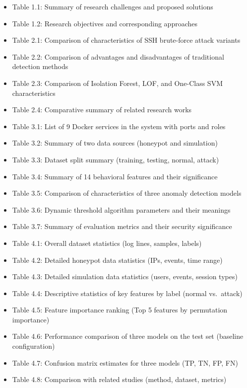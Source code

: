 \documentclass[
  a4paper]{report}
\providecommand{\tightlist}{%
  \setlength{\itemsep}{0pt}\setlength{\parskip}{0pt}}
\begin{document}
\begin{itemize}
\tightlist
\item
  Table 1.1: Summary of research challenges and proposed solutions
\item
  Table 1.2: Research objectives and corresponding approaches
\item
  Table 2.1: Comparison of characteristics of SSH brute-force attack
  variants
\item
  Table 2.2: Comparison of advantages and disadvantages of traditional
  detection methods
\item
  Table 2.3: Comparison of Isolation Forest, LOF, and One-Class SVM
  characteristics
\item
  Table 2.4: Comparative summary of related research works
\item
  Table 3.1: List of 9 Docker services in the system with ports and
  roles
\item
  Table 3.2: Summary of two data sources (honeypot and simulation)
\item
  Table 3.3: Dataset split summary (training, testing, normal, attack)
\item
  Table 3.4: Summary of 14 behavioral features and their significance
\item
  Table 3.5: Comparison of characteristics of three anomaly detection
  models
\item
  Table 3.6: Dynamic threshold algorithm parameters and their meanings
\item
  Table 3.7: Summary of evaluation metrics and their security
  significance
\item
  Table 4.1: Overall dataset statistics (log lines, samples, labels)
\item
  Table 4.2: Detailed honeypot data statistics (IPs, events, time range)
\item
  Table 4.3: Detailed simulation data statistics (users, events, session
  types)
\item
  Table 4.4: Descriptive statistics of key features by label (normal
  vs.~attack)
\item
  Table 4.5: Feature importance ranking (Top 5 features by permutation
  importance)
\item
  Table 4.6: Performance comparison of three models on the test set
  (baseline configuration)
\item
  Table 4.7: Confusion matrix estimates for three models (TP, TN, FP,
  FN)
\item
  Table 4.8: Comparison with related studies (method, dataset, metrics)

\end{itemize}
\end{document}
